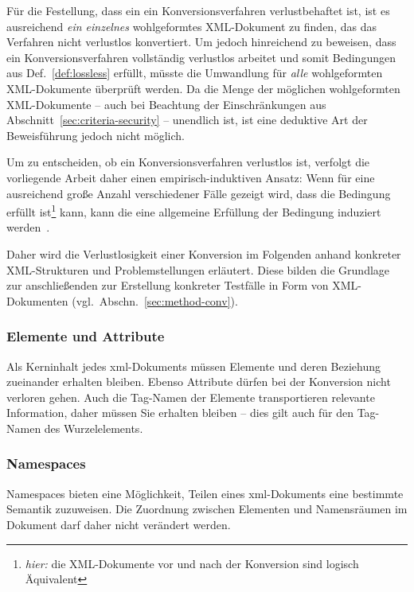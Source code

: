 Für die Festellung, dass ein ein Konversionsverfahren verlustbehaftet ist, ist es ausreichend \emph{ein einzelnes} wohlgeformtes XML-Dokument zu finden, das das Verfahren nicht verlustlos konvertiert. Um jedoch hinreichend zu beweisen, dass ein Konversionsverfahren vollständig verlustlos arbeitet und somit Bedingungen aus Def.~\ref{def:lossless} erfüllt, müsste die Umwandlung für \emph{alle} wohlgeformten XML-Dokumente überprüft werden. Da die Menge der möglichen wohlgeformten XML-Dokumente  -- auch bei Beachtung der Einschränkungen aus Abschnitt~\ref{sec:criteria-security} -- unendlich ist, ist eine deduktive Art der Beweisführung jedoch nicht möglich.

Um zu entscheiden, ob ein Konversionsverfahren verlustlos ist, verfolgt die vorliegende Arbeit daher einen empirisch-induktiven Ansatz: Wenn für eine ausreichend große Anzahl verschiedener Fälle gezeigt wird, dass die Bedingung erfüllt ist\footnote{\emph{hier:} die XML-Dokumente vor und nach der Konversion sind logisch Äquivalent} kann, kann die eine allgemeine Erfüllung der Bedingung induziert werden~\cite[S.~2]{rudner1953judgments}.

Daher wird die Verlustlosigkeit einer Konversion im Folgenden anhand konkreter XML-Strukturen und Problemstellungen erläutert. Diese bilden die Grundlage zur anschließenden zur Erstellung konkreter Testfälle in Form von XML-Dokumenten (vgl.~Abschn.~\ref{sec:method-conv}).

\subsubsection{Elemente und Attribute}

Als Kerninhalt jedes \acrshort{xml}\hyp{}Dokuments müssen Elemente und deren Beziehung zueinander erhalten bleiben. Ebenso Attribute dürfen bei der Konversion nicht verloren gehen. Auch die Tag\hyp{}Namen der Elemente transportieren relevante Information, daher müssen Sie erhalten bleiben -- dies gilt auch für den Tag\hyp{}Namen des Wurzelelements.

\subsubsection{Namespaces}

Namespaces bieten eine Möglichkeit, Teilen eines \acrshort{xml}-Dokuments eine bestimmte Semantik zuzuweisen. Die Zuordnung zwischen Elementen und Namensräumen im Dokument darf daher nicht verändert werden.

